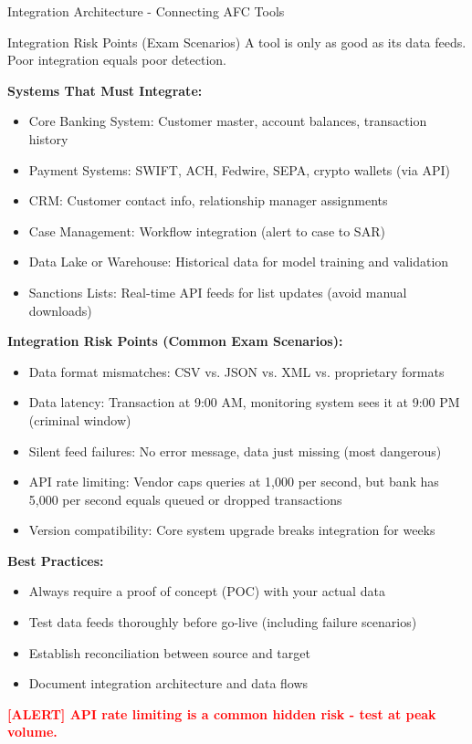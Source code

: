 \documentclass[11pt,a4paper]{beamer}
\newcommand{\redflag}[1]{\textcolor{red}{\textbf{[ALERT] #1}}}
\begin{document}
	\begin{frame}{Integration Architecture - Connecting AFC Tools}
		\begin{block}{Integration Risk Points (Exam Scenarios)}
			A tool is only as good as its data feeds. Poor integration equals poor detection.
		\end{block}
		
		\textbf{Systems That Must Integrate:}
		\begin{itemize}
			\item Core Banking System: Customer master, account balances, transaction history
			\item Payment Systems: SWIFT, ACH, Fedwire, SEPA, crypto wallets (via API)
			\item CRM: Customer contact info, relationship manager assignments
			\item Case Management: Workflow integration (alert to case to SAR)
			\item Data Lake or Warehouse: Historical data for model training and validation
			\item Sanctions Lists: Real-time API feeds for list updates (avoid manual downloads)
		\end{itemize}
		
		\textbf{Integration Risk Points (Common Exam Scenarios):}
		\begin{itemize}
			\item Data format mismatches: CSV vs. JSON vs. XML vs. proprietary formats
			\item Data latency: Transaction at 9:00 AM, monitoring system sees it at 9:00 PM (criminal window)
			\item Silent feed failures: No error message, data just missing (most dangerous)
			\item API rate limiting: Vendor caps queries at 1,000 per second, but bank has 5,000 per second equals queued or dropped transactions
			\item Version compatibility: Core system upgrade breaks integration for weeks
		\end{itemize}
		
		\textbf{Best Practices:}
		\begin{itemize}
			\item Always require a proof of concept (POC) with your actual data
			\item Test data feeds thoroughly before go-live (including failure scenarios)
			\item Establish reconciliation between source and target
			\item Document integration architecture and data flows
		\end{itemize}
		
		\redflag{API rate limiting is a common hidden risk - test at peak volume.}
	\end{frame}
	
\end{document}
